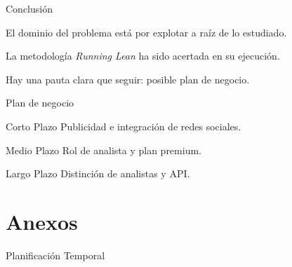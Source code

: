\documentclass[12pt]{beamer}
\begin{document}
		\begin{frame}{Conclusión}
			\begin{block}{}
				El dominio del problema está por explotar a raíz de lo estudiado.
			\end{block}
			\begin{block}{}
				La metodología \textit{Running Lean} ha sido acertada en su ejecución.
			\end{block}
			\begin{block}{}
				Hay una pauta clara que seguir: posible plan de negocio.
			\end{block}
		\end{frame}
		
		\begin{frame}{Plan de negocio}
			\begin{block}{Corto Plazo}
				Publicidad e integración de redes sociales.
			\end{block}
			\begin{block}{Medio Plazo}
				Rol de analista y plan premium.
			\end{block}
			\begin{block}{Largo Plazo}
				Distinción de analistas y API.
			\end{block}
		\end{frame}
	
	\section{Anexos}
        \begin{frame}{Planificación Temporal}
        \end{frame}
\end{document}
